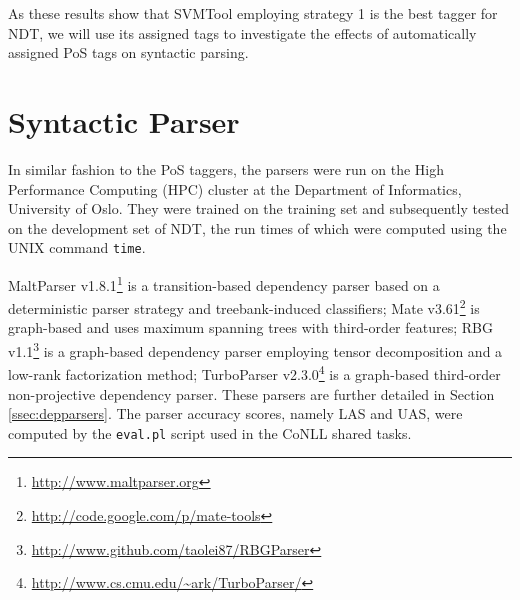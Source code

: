 \documentclass[a4paper,12pt,english]{book}
\begin{document}
As these results show that SVMTool employing strategy 1 is the best tagger for
NDT, we will use its assigned tags to investigate the effects of automatically
assigned PoS tags on syntactic parsing.


\section{Syntactic Parser}
In similar fashion to the PoS taggers, the parsers were run on the High
Performance Computing (HPC) cluster at the Department of Informatics,
University of Oslo. They were trained on the training set and subsequently
tested on the development set of NDT, the run times of which were computed
using the UNIX command \texttt{time}.

MaltParser v1.8.1\footnote{\url{http://www.maltparser.org}}
\cite{Niv:Hal:Nil:07} is a transition-based dependency parser based on a
deterministic parser strategy and treebank-induced classifiers; Mate
v3.61\footnote{\url{http://code.google.com/p/mate-tools}} \cite{Boh:10} is
graph-based and uses maximum spanning trees with third-order features; RBG
v1.1\footnote{\url{http://www.github.com/taolei87/RBGParser}}
\cite{Lei:Xin:Zha:14} is a graph-based dependency parser employing tensor
decomposition and a low-rank factorization method; TurboParser
v2.3.0\footnote{\url{http://www.cs.cmu.edu/~ark/TurboParser/}}
\cite{Mar:Alm:Smi:13} is a graph-based third-order non-projective dependency
parser. These parsers are further detailed in Section \ref{ssec:depparsers}.
The parser accuracy scores, namely LAS and UAS, were computed by the
\texttt{eval.pl} script used in the CoNLL shared tasks.
\end{document}
